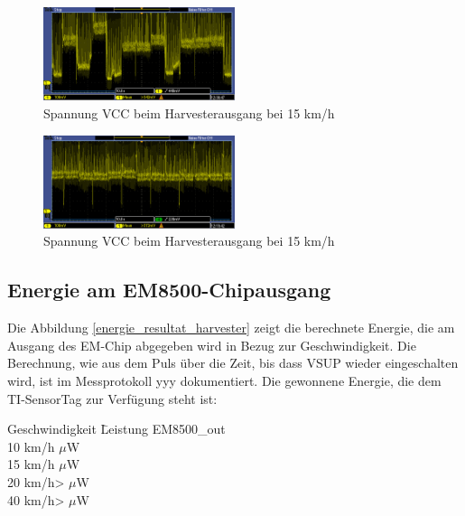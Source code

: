 \begin{figure}[ht]
    \includegraphics[width=0.5\textwidth]{4Resultate/imag/SpannungVCC_47uF.PNG} 
    \caption{Spannung VCC beim Harvesterausgang bei 15 km/h}
    \label{resultat_Harvester_Spannung_47uF}
\end{figure}

\begin{figure}[ht]
    \includegraphics[width=0.5\textwidth]{4Resultate/imag/SpannungVCC_100uF.png} 
    \caption{Spannung VCC beim Harvesterausgang bei 15 km/h}
    \label{resultat_Harvester_Spannung_100uF}
\end{figure}


\subsection{Energie am EM8500-Chipausgang}

Die Abbildung \ref{energie_resultat_harvester} zeigt die berechnete Energie, die am Ausgang des EM-Chip abgegeben wird in Bezug zur Geschwindigkeit. Die Berechnung, wie aus dem Puls über die Zeit, bis dass VSUP wieder eingeschalten wird, ist im  Messprotokoll yyy dokumentiert. Die gewonnene Energie, die dem TI-SensorTag zur Verfügung steht ist:


\begin{minipage}{\textwidth}
    \label{res_em_aus}
    \begin{tabbing}
        Geschwindigkeit \quad\= Leistung EM8500\_out \\[0.8ex]
        10 km/h     $\mu$W\\
        15 km/h    $\mu$W\\
        20 km/h>   $\mu$W\\
        40 km/h>  $\mu$W\\
    \end{tabbing}
\end{minipage}


